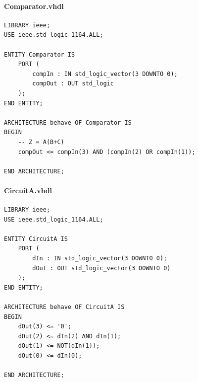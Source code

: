 \documentclass[13pt,a4paper]{report}
\begin{document}
\paragraph{Comparator.vhdl}
\begin{verbatim}
LIBRARY ieee;
USE ieee.std_logic_1164.ALL;

ENTITY Comparator IS
	PORT (
		compIn : IN std_logic_vector(3 DOWNTO 0);
		compOut : OUT std_logic
	);
END ENTITY;

ARCHITECTURE behave OF Comparator IS
BEGIN
	-- Z = A(B+C)
	compOut <= compIn(3) AND (compIn(2) OR compIn(1));

END ARCHITECTURE;
\end{verbatim}

\paragraph{CircuitA.vhdl}
\begin{verbatim}
LIBRARY ieee;
USE ieee.std_logic_1164.ALL;

ENTITY CircuitA IS
	PORT (
		dIn : IN std_logic_vector(3 DOWNTO 0);
		dOut : OUT std_logic_vector(3 DOWNTO 0)
	);
END ENTITY;

ARCHITECTURE behave OF CircuitA IS
BEGIN
	dOut(3) <= '0';
	dOut(2) <= dIn(2) AND dIn(1);
	dOut(1) <= NOT(dIn(1));
	dOut(0) <= dIn(0);

END ARCHITECTURE;
\end{verbatim}
\end{document}
